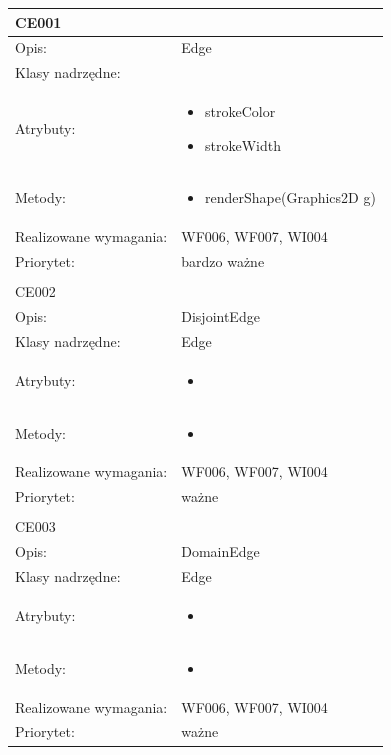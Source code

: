 \documentclass[a4paper,10pt]{article}
\begin{document}
\begin{center}

\begin{longtable}{|m{3cm}|m{9cm}|} \hline

CE001 &  \\ \hline
Opis: & Edge    \\ \hline
Klasy nadrzędne: &     \\ \hline
Atrybuty: & \begin{itemize}
 \item strokeColor
 \item strokeWidth 
\end{itemize}
 \\ \hline
Metody: & \begin{itemize}
 \item renderShape(Graphics2D g)
\end{itemize}
  \\ \hline
Realizowane wymagania: & WF006, WF007, WI004 \\ \hline
Priorytet: & bardzo ważne  \\ \hline

\multicolumn{2}{c}{} \\
 \hline

CE002 &  \\ \hline
Opis: & DisjointEdge    \\ \hline
Klasy nadrzędne: & Edge    \\ \hline
Atrybuty: & \begin{itemize}
 \item 
\end{itemize}
 \\ \hline
Metody: & \begin{itemize}
 \item 
\end{itemize}
  \\ \hline
Realizowane wymagania: & WF006, WF007, WI004 \\ \hline
Priorytet: & ważne  \\ \hline

\multicolumn{2}{c}{} \\
 \hline

CE003 &  \\ \hline
Opis: & DomainEdge    \\ \hline
Klasy nadrzędne: & Edge    \\ \hline
Atrybuty: & \begin{itemize}
 \item 
\end{itemize}
 \\ \hline
Metody: & \begin{itemize}
 \item 
\end{itemize}
  \\ \hline
Realizowane wymagania: & WF006, WF007, WI004 \\ \hline
Priorytet: & ważne  \\ \hline


\end{longtable}
\end{center}
\end{document}
